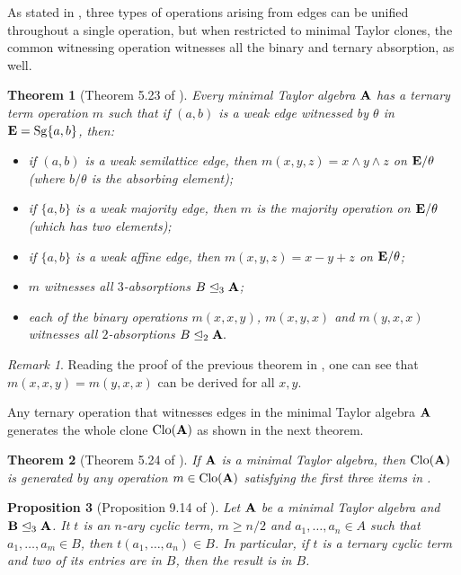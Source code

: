 \documentclass[11pt]{amsart}
\newcommand{\m}[1]{\mathbf{\uppercase{#1}}}
\newtheorem{thm}{Theorem}
\newtheorem{prp}[thm]{Proposition}
\theoremstyle{definition}
\theoremstyle{remark}
\newtheorem*{rem}{Remark}
\theoremstyle{plain}
\begin{document}
As stated in \cite{dreamteam}, three types of operations arising from edges can be unified throughout a single operation, but when restricted to minimal Taylor clones, the common witnessing operation witnesses all the binary and ternary absorption, as well.
\begin{thm}[Theorem 5.23 of \cite{dreamteam}]\label{compositionactslike}
Every minimal Taylor algebra ${\m A}$ has a ternary term operation $m$ such that if $(a,b)$ is a weak edge witnessed by $\theta$ in ${\m E}=\mathrm{Sg}\{a,b\}$, then:
\begin{itemize}
\item if $(a,b)$ is a weak semilattice edge, then $m(x,y,z)=x\wedge y\wedge z$ on ${\m E}/\theta$ (where $b/\theta$ is the absorbing element);
\item if $\{a,b\}$ is a weak majority edge, then $m$ is the majority operation on ${\m E}/\theta$ (which has two elements);
\item if $\{a,b\}$ is a weak affine edge, then $m(x,y,z)=x-y+z$ on ${\m E}/\theta$;
\item $m$ witnesses all $3$-absorptions $B\trianglelefteq_3 {\m A}$;
\item each of the binary operations $m(x,x,y)$, $m(x,y,x)$ and $m(y,x,x)$ witnesses all $2$-absorptions $B\trianglelefteq_2 {\m A}.$
\end{itemize}
\end{thm}
\begin{rem}
Reading the proof of the previous theorem in \cite{dreamteam}, one can see that $m(x,x,y)=m(y,x,x)$ can be derived for all $x,y$.
\end{rem}
Any ternary operation that witnesses edges in the minimal Taylor algebra $\m a$ generates the whole clone $\mathrm{Clo}(\m a)$ as shown in the next theorem.
\begin{thm}[Theorem 5.24 of \cite{dreamteam}]\label{gen}
If ${\m A}$ is a minimal Taylor algebra, then $\mathrm{Clo}({\m A})$ is generated by any operation $m\in \mathrm{Clo}({\m A})$ satisfying the first three items in .
\end{thm}

\begin{prp}[Proposition 9.14 of \cite{dreamteam}]\label{ternaryabscyclic}
Let $\m a$ be a minimal Taylor algebra and $\m b\trianglelefteq_3\m a$. It $t$ is an $n$-ary cyclic term, $m\geqslant n/2$ and $a_1,\dots,a_n\in A$ such that $a_1,\dots,a_m\in B$, then $t(a_1,\dots,a_n)\in B$. In particular, if $t$ is a ternary cyclic term and two of its entries are in $B$, then the result is in $B$.
\end{prp}
\end{document}
